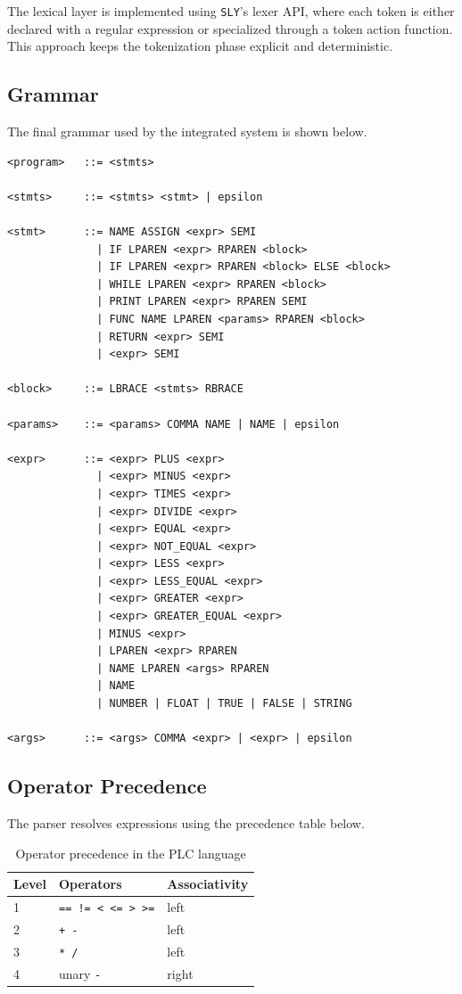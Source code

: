 \documentclass[12pt,a4paper]{article}
\begin{document}
The lexical layer is implemented using \texttt{SLY}'s lexer API, where each token is either declared with a regular expression or specialized through a token action function. This approach keeps the tokenization phase explicit and deterministic.

\subsection{Grammar}
The final grammar used by the integrated system is shown below.

\begin{lstlisting}
<program>   ::= <stmts>

<stmts>     ::= <stmts> <stmt> | epsilon

<stmt>      ::= NAME ASSIGN <expr> SEMI
              | IF LPAREN <expr> RPAREN <block>
              | IF LPAREN <expr> RPAREN <block> ELSE <block>
              | WHILE LPAREN <expr> RPAREN <block>
              | PRINT LPAREN <expr> RPAREN SEMI
              | FUNC NAME LPAREN <params> RPAREN <block>
              | RETURN <expr> SEMI
              | <expr> SEMI

<block>     ::= LBRACE <stmts> RBRACE

<params>    ::= <params> COMMA NAME | NAME | epsilon

<expr>      ::= <expr> PLUS <expr>
              | <expr> MINUS <expr>
              | <expr> TIMES <expr>
              | <expr> DIVIDE <expr>
              | <expr> EQUAL <expr>
              | <expr> NOT_EQUAL <expr>
              | <expr> LESS <expr>
              | <expr> LESS_EQUAL <expr>
              | <expr> GREATER <expr>
              | <expr> GREATER_EQUAL <expr>
              | MINUS <expr>
              | LPAREN <expr> RPAREN
              | NAME LPAREN <args> RPAREN
              | NAME
              | NUMBER | FLOAT | TRUE | FALSE | STRING

<args>      ::= <args> COMMA <expr> | <expr> | epsilon
\end{lstlisting}

\subsection{Operator Precedence}
The parser resolves expressions using the precedence table below.

\begin{table}[H]
\centering
\begin{tabular}{lll}
\toprule
Level & Operators & Associativity \\
\midrule
1 & \texttt{== != < <= > >=} & left \\
2 & \texttt{+ -} & left \\
3 & \texttt{* /} & left \\
4 & unary \texttt{-} & right \\
\bottomrule
\end{tabular}
\caption{Operator precedence in the PLC language}
\end{table}
\end{document}
